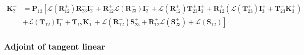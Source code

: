 \begin{equation}
	\begin{split}
		\mathbf{K}^{-}_{2} &= \mathbf{P}_{13}\left[\mathcal{L}(\mathbf{R}^{+}_{12})\mathbf{R}^{-}_{23}\mathbf{I}^{-}_{2} + \mathbf{R}^{+}_{12}\mathcal{L}(\mathbf{R}^{-}_{23})\mathbf{I}^{-}_{2} + \mathcal{L}(\mathbf{R}^{+}_{12})\mathbf{T}^{+}_{23}\mathbf{I}^{+}_{3} + \mathbf{R}^{+}_{12}(\mathcal{L}(\mathbf{T}^{+}_{23})\mathbf{I}^{+}_{3} + \mathbf{T}^{+}_{23}\mathbf{K}^{+}_{3}) \right. \\
		                   &+ \left.\mathcal{L}(\mathbf{T}^{-}_{12})\mathbf{I}^{-}_{1} + \mathbf{T}^{-}_{12}\mathbf{K}^{-}_{1} + \mathcal{L}(\mathbf{R}^{+}_{12})\mathbf{S}^{+}_{23} + \mathbf{R}^{+}_{12}\mathcal{L}(\mathbf{S}^{+}_{23}) + \mathcal{L}(\mathbf{S}^{-}_{12})\right]
	\end{split}
	\label{eq:radiance-internal_radiance-K_m_2_0}
\end{equation}


%
\subsubsection{Adjoint of tangent linear}
\label{sec:radiance-internal_radiance-adjoint_of_tangent_linear}
